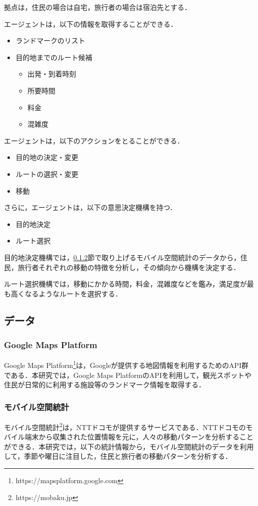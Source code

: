 拠点は，住民の場合は自宅，旅行者の場合は宿泊先とする．

エージェントは，以下の情報を取得することができる．
\begin{itemize}
  \item ランドマークのリスト
  \item 目的地までのルート候補
    \begin{itemize}
      \item 出発・到着時刻
      \item 所要時間
      \item 料金
      \item 混雑度
    \end{itemize}
\end{itemize}

エージェントは，以下のアクションをとることができる．
\begin{itemize}
  \item 目的地の決定・変更
  \item ルートの選択・変更
  \item 移動
\end{itemize}

さらに，エージェントは，以下の意思決定機構を持つ．
\begin{itemize}
  \item 目的地決定
  \item ルート選択
\end{itemize}

目的地決定機構では，\ref{section_mobaku}節で取り上げるモバイル空間統計のデータから，住民，旅行者それぞれの移動の特徴を分析し，その傾向から機構を決定する．

ルート選択機構では，移動にかかる時間，料金，混雑度などを鑑み，満足度が最も高くなるようなルートを選択する．

\subsection{データ}
\subsubsection{Google Maps Platform}
Google Maps Platform\footnote{https://mapsplatform.google.com}は，Googleが提供する地図情報を利用するためのAPI群である．本研究では，Google Maps PlatformのAPIを利用して，観光スポットや住民が日常的に利用する施設等のランドマーク情報を取得する．

\subsubsection{モバイル空間統計}
\label{section_mobaku}
モバイル空間統計\footnote{https://mobaku.jp}は，NTTドコモが提供するサービスである．NTTドコモのモバイル端末から収集された位置情報を元に，人々の移動パターンを分析することができる．本研究では，以下の統計情報から，モバイル空間統計のデータを利用して，季節や曜日に注目した，住民と旅行者の移動パターンを分析する．

